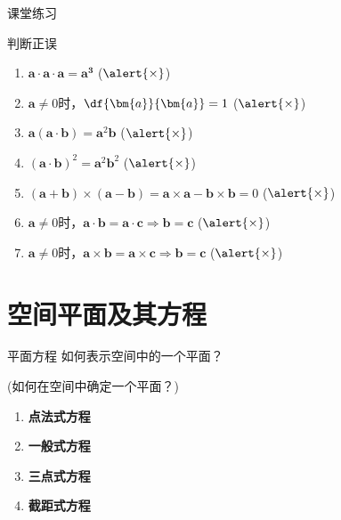 \begin{frame}{课堂练习}
	\linespread{1.2}
	\begin{exampleblock}{判断正误\hfill}\pause
		\begin{enumerate}
		  \item $\bm{a}\cdot\bm{a}\cdot\bm{a}=\bm{a^3}$
		  \quad\pause(\;$\alert{\times}$\;)\pause
		  \item $\bm{a}\ne 0$时，$\df{\bm{a}}{\bm{a}}=1$
		  \quad\pause(\;$\alert{\times}$\;)\pause
		  \item $\bm{a}(\bm{a}\cdot\bm{b})=\bm{a}^2\bm{b}$
		  \quad\pause(\;$\alert{\times}$\;)\pause
		  \item $(\bm{a}\cdot\bm{b})^2=\bm{a}^2\bm{b}^2$
		  \quad\pause(\;$\alert{\times}$\;)\pause
		  \item $(\bm{a}+\bm{b})\times(\bm{a}-\bm{b})=\bm{a}\times\bm{a}
		  -\bm{b}\times\bm{b}=0$
		  \quad\pause(\;$\alert{\times}$\;)\pause
		  \item $\bm{a}\ne
		  0$时，$\bm{a}\cdot\bm{b}=\bm{a}\cdot\bm{c}\Rightarrow\bm{b}=\bm{c}$
		  \quad\pause(\;$\alert{\times}$\;)\pause
		  \item $\bm{a}\ne
		  0$时，$\bm{a}\times\bm{b}=\bm{a}\times\bm{c}\Rightarrow\bm{b}=\bm{c}$
		  \quad\pause(\;$\alert{\times}$\;)
		\end{enumerate}
	\end{exampleblock}
\end{frame}

\section{空间平面及其方程}

\begin{frame}{平面方程}
	\linespread{1.5}\pause 
	如何表示空间中的一个平面？\pause 
	
	\hspace{3em}\alert{(如何在空间中确定一个平面？)}\pause 
	
	\begin{enumerate}
	  \item {\bf 点法式方程}\pause 
	  \item {\bf 一般式方程}\pause 
	  \item {\bf 三点式方程}\pause 
	  \item {\bf 截距式方程}
	\end{enumerate}
\end{frame}

